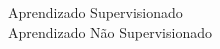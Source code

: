 \documentclass[preview]{standalone}
\begin{document}
Aprendizado Supervisionado\\Aprendizado Não Supervisionado\\
\end{document}
